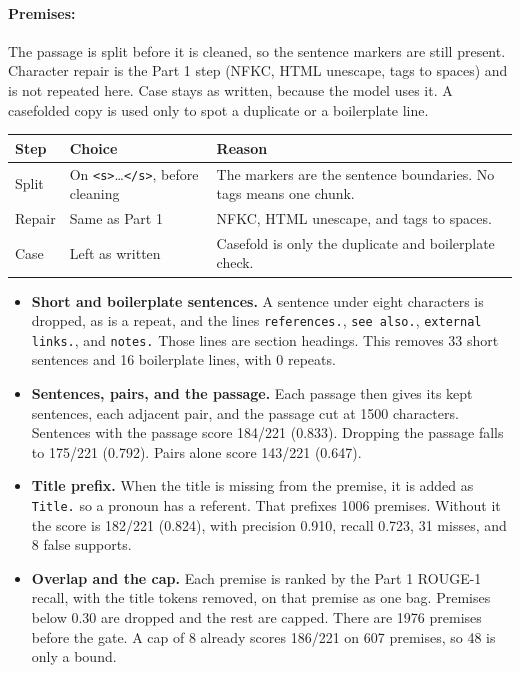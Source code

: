 \documentclass[12pt,a4paper]{article}
\begin{document}
\paragraph{Premises:}

The passage is split before it is cleaned, so the sentence markers are still present. Character repair is the Part 1 step (NFKC, HTML unescape, tags to spaces) and is not repeated here. Case stays as written, because the model uses it. A casefolded copy is used only to spot a duplicate or a boilerplate line.

\begin{center}
\small
\begin{tabular}{@{}llp{7.6cm}@{}}
\toprule
Step & Choice & Reason \\
\midrule
Split & On \texttt{<s>}\ldots\texttt{</s>}, before cleaning & The markers are the sentence boundaries. No tags means one chunk. \\
Repair & Same as Part 1 & NFKC, HTML unescape, and tags to spaces. \\
Case & Left as written & Casefold is only the duplicate and boilerplate check. \\
\bottomrule
\end{tabular}
\end{center}

\begin{itemize}\setlength{\itemsep}{0.4em}
\item \textbf{Short and boilerplate sentences.}
A sentence under eight characters is dropped, as is a repeat, and the lines \texttt{references.}, \texttt{see also.}, \texttt{external links.}, and \texttt{notes.}
Those lines are section headings. This removes 33 short sentences and 16 boilerplate lines, with 0 repeats.
\item \textbf{Sentences, pairs, and the passage.}
Each passage then gives its kept sentences, each adjacent pair, and the passage cut at 1500 characters.
Sentences with the passage score 184/221 (0.833). Dropping the passage falls to 175/221 (0.792). Pairs alone score 143/221 (0.647).
\item \textbf{Title prefix.}
When the title is missing from the premise, it is added as \texttt{Title.} so a pronoun has a referent.
That prefixes 1006 premises. Without it the score is 182/221 (0.824), with precision 0.910, recall 0.723, 31 misses, and 8 false supports.
\item \textbf{Overlap and the cap.}
Each premise is ranked by the Part 1 ROUGE-1 recall, with the title tokens removed, on that premise as one bag. Premises below 0.30 are dropped and the rest are capped.
There are 1976 premises before the gate. A cap of 8 already scores 186/221 on 607 premises, so 48 is only a bound.
\end{itemize}
\end{document}

